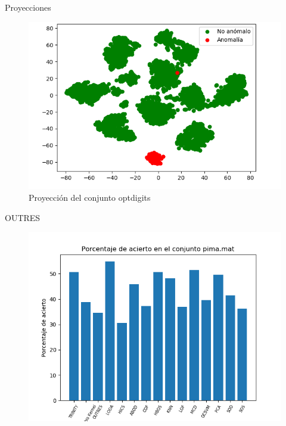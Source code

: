 \documentclass[10pt]{beamer}
\begin{document}
\begin{frame}[fragile]{Proyecciones}
\vspace{10px}

\begin{figure}
	\centering
	\includegraphics[scale=0.6]{Imagenes/optdigits}
	\caption*{Proyección del conjunto optdigits}
\end{figure}

\end{frame}

\begin{frame}[fragile]{OUTRES}
\vspace{10px}

\begin{figure}
	\centering
	\includegraphics[scale=0.6]{Imagenes/pima-score}
\end{figure}

\end{frame}
\end{document}
